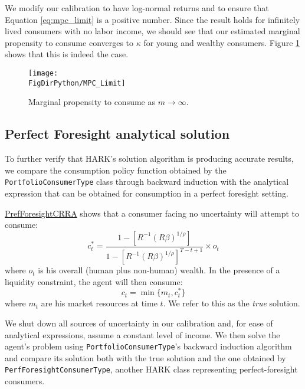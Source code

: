 \documentclass[../CGMPort.tex]{subfiles}
\begin{document}
We modify our calibration to have log-normal returns and to ensure that Equation \ref{eq:mpc_limit} is a positive number. Since the result holds for infinitely lived consumers with no labor income, we should see that our estimated marginal propensity to consume converges to $\kappa$ for young and wealthy consumers. Figure \ref{fig:mpc_lim} shows that this is indeed the case.

\begin{figure}[h]
	\texttt{[image: \\FigDirPython/MPC\_Limit]}
	\caption{Marginal propensity to consume as $m \rightarrow \infty$.}
	\label{fig:mpc_lim}
\end{figure}

\subsection{Perfect Foresight analytical solution}

To further verify that HARK's solution algorithm is producing accurate results,
we compare the consumption policy function obtained by the
\texttt{PortfolioConsumerType} class through backward induction with the
analytical expression that can be obtained for consumption in a perfect
foresight setting.

\href{http://www.econ2.jhu.edu/people/ccarroll/public/LectureNotes/Consumption/PerfForesightCRRA/}{PrefForesightCRRA}
shows that a consumer facing no uncertainty will attempt to consume:
\begin{equation}
	c^*_t = \frac{1 - \left[ R^{-1} \left( R \beta \right)^{1/\rho}\right]}{1 - 
	\left[ R^{-1} \left( R \beta \right)^{1/\rho}\right]^{T-t+1}}\times o_t
\end{equation}
where $o_t$ is his overall (human plus non-human) wealth. In the presence of a liquidity constraint, the agent will then consume:
\begin{equation}
	c_t = \min \{ m_t , c^*_t\}
\end{equation}
where $m_t$ are his market resources at time $t$. We refer to this as the 
\emph{true} solution.

We shut down all sources of uncertainty in our calibration and, for ease of
analytical expressions, assume a constant level of income. We then solve the
agent's problem using \texttt{PortfolioConsumerType}'s backward induction
algorithm and compare its solution both with the true solution and the one
obtained by \texttt{PerfForesightConsumerType}, another HARK class representing perfect-foresight consumers.
\end{document}
